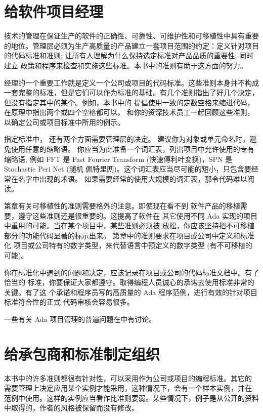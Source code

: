 \section{给软件项目经理}
技术的管理在保证生产的软件的正确性、可靠性、可维护性和可移植性中具有重要
的地位。管理层必须为生产高质量的产品建立一套项目范围的约定：定义针对项目
的代码标准和准则; 让所有人理解为什么保持选定标准对产品品质的重要性; 同时建立
政策和程序来检查和实施这些标准。本书中的准则有助于这方面的努力。

经理的一个重要工作就是定义一个公司或项目的代码标准。这些准则本身并不构成
一套完整的标准，但是它们可以作为标准的基础。有几个准则指出了好几个决定，
但没有指定其中的某个。例如，本书中的 \cite{g:src:format}
提倡使用一致的定数空格来缩进代码，在原理中指出两个或四个空格都可以。
和你的资深技术员工一起回顾这些准则，以确定公司或项目标准中所用的例示。

指定标准中， 还有两个方面需要管理层的决定。
\cite{g:readabilty:abbr} 建议你为对象或单元命名时，避免使用任意的缩略语。
你应当为此准备一个词汇表，列出项目中允许使用的专有缩略语, 例如 FFT 是 Fast
Fourier Transform (快速傅利叶变换)，SPN 是 Stochastic Peri Net (随机
佩特里网)。这个词汇表应当尽可能的短小，只包含要经常在名字中出现的术语。
如果需要经常的使用大规模的词汇表，那令代码难以阅读。

第\cite{c:portability}章有关可移植性的准则需要格外的注意。即使现在看不到
软件产品的移植需要，遵守这些准则还是很重要的。这提高了软件在
其它使用不同 Ada 实现的项目中重用的可能。当在某个项目中，某些准则必须被
放松，你应该坚持把不可移植部分的功能代码显著的标示出来。
第\cite{c:portability}章中的准则要求在项目或公司中定义和标准化
项目或公司特有的数字类型，来代替语言中预定义的数字类型 (有不可移植的可能)。

你在标准化中遇到的问题和决定，应该记录在项目或公司的代码标准文档中。有了恰当的
标准，你要保证大家都遵守。取得编程人员诚心的承诺去使用标准非常的关键。有了这
个承诺和程序员写的高质量的 Ada 程序范例，进行有效的针对项目标准符合性的正式
代码审核会容易很多。

一些有关 Ada 项目管理的普遍问题在\cite{hefley92}中有讨论。

\section{给承包商和标准制定组织}
本书中的许多准则都很有针对性，可以采用作为公司或项目的编程标准。其它的
需要管理上决定应用某个实例才能采用，这种情况下，会有一个样本实例，并在
范例中使用。这样的实例应当看作比准则要弱。某些情况下，例子是从公开的资料
中取得的，作者的风格被保留而没有修改。

